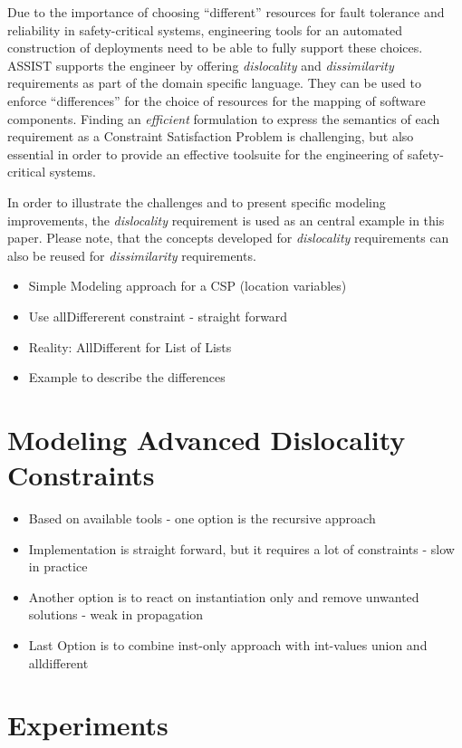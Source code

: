 \documentclass[english,biblatex]{lni}
\begin{document}
Due to the importance of choosing  ``different'' resources for fault tolerance and reliability in safety-critical systems, engineering tools for an automated construction of deployments need to be able to fully support these choices.
ASSIST supports the engineer by offering \emph{dislocality} and \emph{dissimilarity} requirements as part of the domain specific language.
They can be used to enforce ``differences'' for the choice of resources for the mapping of software components.
Finding an \emph{efficient} formulation to express the semantics of each requirement as a Constraint Satisfaction Problem is challenging, but also essential in order to provide an effective toolsuite for the engineering of safety-critical systems.

In order to illustrate the challenges and to present specific modeling improvements, the \emph{dislocality} requirement is used as an central example in this paper.
Please note, that the concepts developed for \emph{dislocality} requirements can also be reused for \emph{dissimilarity} requirements.

\begin{itemize}
\item Simple Modeling approach for a CSP (location variables)
\item Use allDiffererent constraint - straight forward
\item Reality: AllDifferent for List of Lists
\item Example to describe the differences
\end{itemize}

\section{Modeling Advanced Dislocality Constraints}

\begin{itemize}
\item Based on available tools - one option is the recursive approach
\item Implementation is straight forward, but it requires a lot of constraints - slow in practice
\item Another option is to react on instantiation only and remove unwanted solutions - weak in propagation
\item Last Option is to combine inst-only approach with int-values union and alldifferent
\end{itemize}

\section{Experiments}
\end{document}
